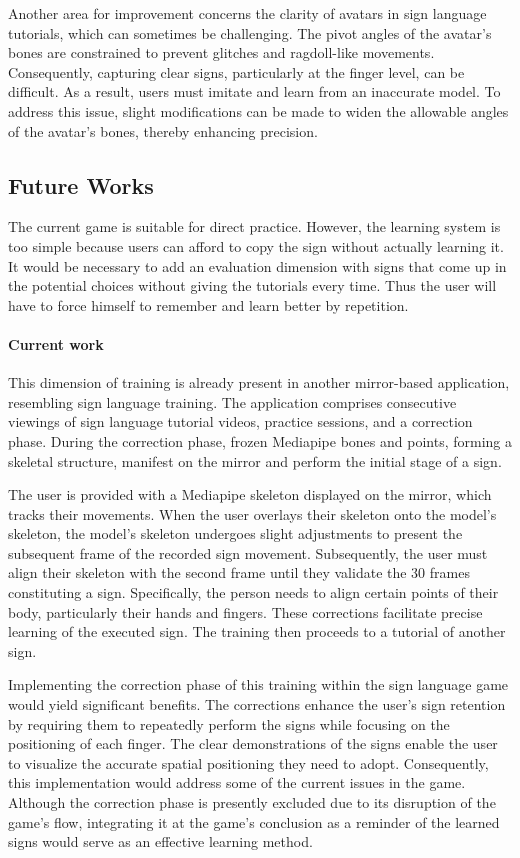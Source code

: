 Another area for improvement concerns the clarity of avatars in sign language tutorials, which can sometimes be challenging. The pivot angles of the avatar's bones are constrained to prevent glitches and ragdoll-like movements. Consequently, capturing clear signs, particularly at the finger level, can be difficult. As a result, users must imitate and learn from an inaccurate model. To address this issue, slight modifications can be made to widen the allowable angles of the avatar's bones, thereby enhancing precision.

\subsection{Future Works}

The current game is suitable for direct practice. However, the learning system is too simple because users can afford to copy the sign without actually learning it. It would be necessary to add an evaluation dimension with signs that come up in the potential choices without giving the tutorials every time. Thus the user will have to force himself to remember and learn better by repetition.

\paragraph{Current work}

This dimension of training is already present in another mirror-based application, resembling sign language training. The application comprises consecutive viewings of sign language tutorial videos, practice sessions, and a correction phase. During the correction phase, frozen Mediapipe bones and points, forming a skeletal structure, manifest on the mirror and perform the initial stage of a sign.

The user is provided with a Mediapipe skeleton displayed on the mirror, which tracks their movements. When the user overlays their skeleton onto the model's skeleton, the model's skeleton undergoes slight adjustments to present the subsequent frame of the recorded sign movement. Subsequently, the user must align their skeleton with the second frame until they validate the 30 frames constituting a sign. Specifically, the person needs to align certain points of their body, particularly their hands and fingers. These corrections facilitate precise learning of the executed sign. The training then proceeds to a tutorial of another sign.

Implementing the correction phase of this training within the sign language game would yield significant benefits. The corrections enhance the user's sign retention by requiring them to repeatedly perform the signs while focusing on the positioning of each finger. The clear demonstrations of the signs enable the user to visualize the accurate spatial positioning they need to adopt. Consequently, this implementation would address some of the current issues in the game. Although the correction phase is presently excluded due to its disruption of the game's flow, integrating it at the game's conclusion as a reminder of the learned signs would serve as an effective learning method.